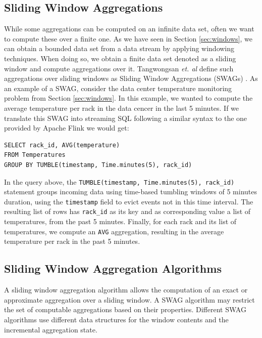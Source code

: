 \subsection{Sliding Window Aggregations}

While some aggregations can be computed on an infinite data set, often we want to compute these over a finite one. As we have seen in Section \ref{sec:windows}, we can obtain a bounded data set from a data stream by applying windowing techniques. When doing so, we obtain a finite data set denoted as a sliding window and compute aggregations over it. Tangwongsan \emph{et. al} define such aggregations over sliding windows as Sliding Window Aggregations (SWAGs) \cite{Tangwongsan-Sliding-Window-Aggregation-Algorithms}. As an example of a SWAG, consider the data center temperature monitoring problem from Section \ref{sec:windows}. In this example, we wanted to compute the average temperature per rack in the data cencer in the last 5 minutes. If we translate this SWAG into streaming SQL following a similar syntax to the one provided by Apache Flink \cite{ApacheFlink} we would get:

\begin{verbatim}
SELECT rack_id, AVG(temperature)
FROM Temperatures
GROUP BY TUMBLE(timestamp, Time.minutes(5), rack_id)
\end{verbatim}

In the query above, the
\texttt{TUMBLE(timestamp, Time.minutes(5), rack\_id)} statement groups incoming data using time-based tumbling windows of 5 minutes duration, using the \texttt{timestamp} field to evict events not in this time interval. The resulting list of rows has \texttt{rack\_id} as its key and as corresponding value a list of temperatures, from the past 5 minutes. Finally, for each rack and its list of temperatures, we compute an \texttt{AVG} aggregation, resulting in the average temperature per rack in the past 5 minutes.


\subsection{Sliding Window Aggregation Algorithms} \label{sec:back-swag-algs}

A sliding window aggregation algorithm allows the computation of an exact or approximate aggregation over a sliding window. A SWAG algorithm may restrict the set of computable aggregations based on their properties. Different SWAG algorithms use different data structures for the window contents and the incremental aggregation state.

